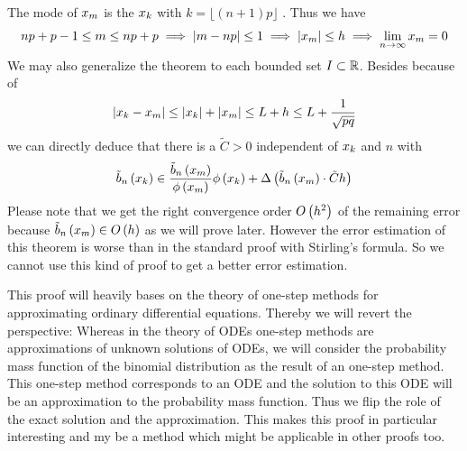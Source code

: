 \begin{remark} \label{remark:alt_local}
  The mode of $\xnp$ is the $\x[k]$ with $k = \lfloor (n+1)p \rfloor$ \cite{nicolas}\cite{wiki:binomial_distribution}. Thus we have
  \begin{align}
    np+p-1 \le \knp \le np+p \implies \abs{\knp-np} \le 1 \implies \abs{\xnp} \le h \implies \lim_{n\to\infty} \xnp = 0
  \end{align}
  We may also generalize the theorem to each bounded set $I \subset \R$. Besides because of
  \begin{align}
    \abs{\x[k]-\xnp} \le \abs{\x[k]}+\abs{\xnp} \le L + h \le L + \frac{1}{\sqrt{pq}}
  \end{align}
  we can directly deduce that there is a $\tilde C > 0$ independent of $\x$ and $n$ with
  \begin{align}
    \bb{\x} \in \frac{\bnp}{\fphi{\xnp}}\fphi{\x} + \bigabs{{\bnp}\cdot \tilde Ch}
  \end{align}
  Please note that we get the right convergence order $\bigo{h^2}$ of the remaining error because $\bnp \in \bigo{h}$ as we will prove later. However the error estimation of this theorem is worse than in the standard proof with Stirling's formula. So we cannot use this kind of proof to get a better error estimation.
\end{remark}

This proof will heavily bases on the theory of one-step methods for approximating ordinary differential equations. Thereby we will revert the perspective: Whereas in the theory of ODEs one-step methods are approximations of unknown solutions of ODEs, we will consider the probability mass function of the binomial distribution as the result of an one-step method. This one-step method corresponds to an ODE and the solution to this ODE will be an approximation to the probability mass function. Thus we flip the role of the exact solution and the approximation. This makes this proof in particular interesting and my be a method which might be applicable in other proofs too.


